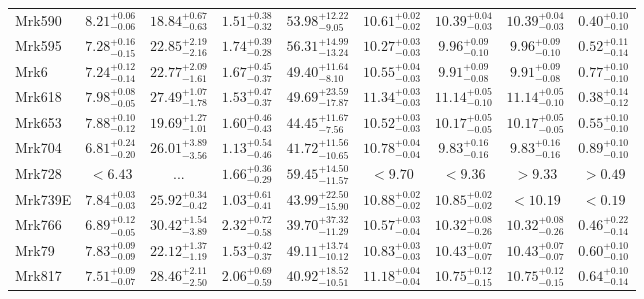 \documentclass[onecolumn]{mn2e}
\begin{document}
{\begin{center}
\begin{longtable}{lcccccccc}
Mrk590 & $8.21_{-0.06}^{+0.06}$ & $18.84_{-0.63}^{+0.67}$ & $1.51_{-0.32}^{+0.38}$ &$53.98_{-9.05}^{+12.22}$ & $10.61_{-0.02}^{+0.02}$ & $10.39_{-0.03}^{+0.04}$ & $10.39_{-0.03}^{+0.04}$ & $0.40_{-0.10}^{+0.10}$ \\
Mrk595 & $7.28_{-0.15}^{+0.16}$ & $22.85_{-2.16}^{+2.19}$ & $1.74_{-0.28}^{+0.39}$ &$56.31_{-13.24}^{+14.99}$ & $10.27_{-0.03}^{+0.03}$ & $9.96_{-0.10}^{+0.09}$ & $9.96_{-0.10}^{+0.09}$ & $0.52_{-0.14}^{+0.11}$ \\
Mrk6 & $7.24_{-0.14}^{+0.12}$ & $22.77_{-1.61}^{+2.09}$ & $1.67_{-0.37}^{+0.45}$ &$49.40_{-8.10}^{+11.64}$ & $10.55_{-0.03}^{+0.04}$ & $9.91_{-0.08}^{+0.09}$ & $9.91_{-0.08}^{+0.09}$ & $0.77_{-0.10}^{+0.10}$ \\
Mrk618 & $7.98_{-0.05}^{+0.08}$ & $27.49_{-1.78}^{+1.07}$ & $1.53_{-0.37}^{+0.47}$ &$49.69_{-17.87}^{+23.59}$ & $11.34_{-0.03}^{+0.03}$ & $11.14_{-0.10}^{+0.05}$ & $11.14_{-0.10}^{+0.05}$ & $0.38_{-0.12}^{+0.14}$ \\
Mrk653 & $7.88_{-0.12}^{+0.10}$ & $19.69_{-1.01}^{+1.27}$ & $1.60_{-0.43}^{+0.46}$ &$44.45_{-7.56}^{+11.67}$ & $10.52_{-0.03}^{+0.03}$ & $10.17_{-0.05}^{+0.05}$ & $10.17_{-0.05}^{+0.05}$ & $0.55_{-0.10}^{+0.10}$ \\
Mrk704 & $6.81_{-0.20}^{+0.24}$ & $26.01_{-3.56}^{+3.89}$ & $1.13_{-0.46}^{+0.54}$ &$41.72_{-10.65}^{+11.56}$ & $10.78_{-0.04}^{+0.04}$ & $9.83_{-0.16}^{+0.16}$ & $9.83_{-0.16}^{+0.16}$ & $0.89_{-0.10}^{+0.10}$ \\
Mrk728 & $<6.43$ & ... & $1.66_{-0.29}^{+0.36}$ &$59.45_{-11.57}^{+14.50}$ & $<9.70$ & $<9.36$ & $>9.33$ & $>0.49$ \\
Mrk739E & $7.84_{-0.03}^{+0.03}$ & $25.92_{-0.42}^{+0.34}$ & $1.03_{-0.41}^{+0.61}$ &$43.99_{-15.90}^{+22.50}$ & $10.88_{-0.02}^{+0.02}$ & $10.85_{-0.02}^{+0.02}$ & $<10.19$ & $<0.19$ \\
Mrk766 & $6.89_{-0.05}^{+0.12}$ & $30.42_{-3.89}^{+1.54}$ & $2.32_{-0.58}^{+0.72}$ &$39.70_{-11.29}^{+37.32}$ & $10.57_{-0.04}^{+0.03}$ & $10.32_{-0.26}^{+0.08}$ & $10.32_{-0.26}^{+0.08}$ & $0.46_{-0.14}^{+0.22}$ \\
Mrk79 & $7.83_{-0.09}^{+0.09}$ & $22.12_{-1.19}^{+1.37}$ & $1.53_{-0.37}^{+0.42}$ &$49.11_{-10.12}^{+13.74}$ & $10.83_{-0.03}^{+0.03}$ & $10.43_{-0.07}^{+0.07}$ & $10.43_{-0.07}^{+0.07}$ & $0.60_{-0.10}^{+0.10}$ \\
Mrk817 & $7.51_{-0.07}^{+0.09}$ & $28.46_{-2.50}^{+2.11}$ & $2.06_{-0.59}^{+0.69}$ &$40.92_{-10.51}^{+18.52}$ & $11.18_{-0.04}^{+0.04}$ & $10.75_{-0.15}^{+0.12}$ & $10.75_{-0.15}^{+0.12}$ & $0.64_{-0.14}^{+0.10}$ \\

\end{longtable}
\end{center}}
\end{document}
